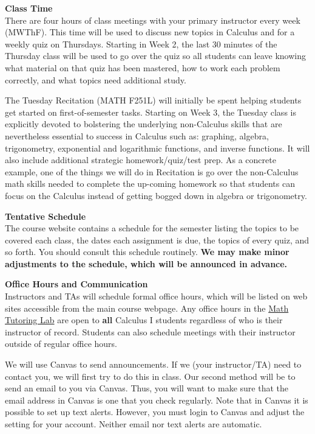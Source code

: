 \documentclass[12pt]{article}
\renewcommand{\emph}[1]{\textsf{\textbf{#1}}}
\newcommand{\localhead}[1]{\par\smallskip\textbf{#1}\nobreak\\}%
\def\heading#1{\localhead{\large\emph{#1}}}
\begin{document}
\newpage

\heading{Class Time}
There are four hours of class meetings with your primary instructor every week (MWThF). This time will be used to discuss new topics in Calculus and for a weekly quiz on Thursdays. Starting in Week 2, the last 30 minutes of the Thursday class will be used to go over the quiz so all students can leave knowing what material on that quiz has been mastered, how to work each problem correctly,  and what topics need additional study. 

The Tuesday Recitation (MATH F251L) will initially be spent helping students get started on first-of-semester tasks. Starting on Week 3, the Tuesday class is explicitly devoted to bolstering the underlying non-Calculus skills that are nevertheless essential to success in Calculus such as: graphing, algebra, trigonometry, exponential and logarithmic functions, and inverse functions. It will also include additional strategic homework/quiz/test prep. As a concrete example, one of the things we will do in Recitation is go over the non-Calculus math skills needed to complete the up-coming homework so that students can focus on the Calculus instead of getting bogged down in algebra or trigonometry.

\heading{Tentative Schedule}
The course website contains a %
schedule for the semester listing
the topics to be covered each class, the dates each assignment is due,
the topics of every quiz, and so forth. You should consult this schedule
routinely.  {\bf We may make minor adjustments to the schedule, which
will be announced in advance.}

\heading{Office Hours and Communication}
Instructors and TAs will schedule formal office hours, which will be listed on web sites accessible from the main course webpage. Any office hours in the \href{https://uaf.edu/dms/mathlab/}{Math Tutoring Lab} are open to \emph{all} Calculus I students regardless of who is their instructor of record. Students can also schedule meetings with their instructor outside of regular office hours.

We will use Canvas to send announcements. If we (your instructor/TA) need to contact you, we will first try to do this in class. Our second method will be to send an email to you via Canvas. Thus, you will want to make sure that the email address in Canvas is one that you check regularly. Note that in Canvas it is possible to set up text alerts. However, you must login to Canvas and adjust the setting for your account. Neither email nor text alerts are automatic.
\end{document}
